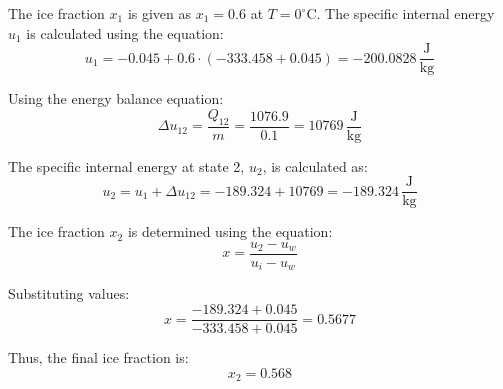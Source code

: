 The ice fraction \( x_1 \) is given as \( x_1 = 0.6 \) at \( T = 0^\circ \text{C} \).  
The specific internal energy \( u_1 \) is calculated using the equation:  
\[
u_1 = -0.045 + 0.6 \cdot (-333.458 + 0.045) = -200.0828 \, \frac{\text{J}}{\text{kg}}
\]

Using the energy balance equation:  
\[
\Delta u_{12} = \frac{Q_{12}}{m} = \frac{1076.9}{0.1} = 10769 \, \frac{\text{J}}{\text{kg}}
\]

The specific internal energy at state 2, \( u_2 \), is calculated as:  
\[
u_2 = u_1 + \Delta u_{12} = -189.324 + 10769 = -189.324 \, \frac{\text{J}}{\text{kg}}
\]

The ice fraction \( x_2 \) is determined using the equation:  
\[
x = \frac{u_2 - u_w}{u_i - u_w}
\]

Substituting values:  
\[
x = \frac{-189.324 + 0.045}{-333.458 + 0.045} = 0.5677
\]

Thus, the final ice fraction is:  
\[
x_2 = 0.568
\]